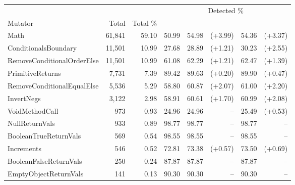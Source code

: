   \begin{tabular*}{\linewidth}{@{\hspace{\tabcolsep}\extracolsep{\fill}}lrrcrrrr}
  \toprule
   &  &  & \multicolumn{5}{c}{Detected \%} \\
  \cmidrule(lr){4-8}
  Mutator & Total & Total \% & \VariantInitial{} & \multicolumn{2}{c}{\VariantNaiveC{}} & \multicolumn{2}{c}{\VariantImprovedC{}} \\
  \midrule
  Math & 61,841 & 59.10 & 50.99 & 54.98 & (+3.99) & 54.36 & (+3.37) \\
  ConditionalsBoundary & 11,501 & 10.99 & 27.68 & 28.89 & (+1.21) & 30.23 & (+2.55) \\
  RemoveConditionalOrderElse & 11,501 & 10.99 & 61.08 & 62.29 & (+1.21) & 62.47 & (+1.39) \\
  PrimitiveReturns & 7,731 & 7.39 & 89.42 & 89.63 & (+0.20) & 89.90 & (+0.47) \\
  RemoveConditionalEqualElse & 5,536 & 5.29 & 58.80 & 60.87 & (+2.07) & 61.00 & (+2.20) \\
  InvertNegs & 3,122 & 2.98 & 58.91 & 60.61 & (+1.70) & 60.99 & (+2.08) \\
  VoidMethodCall & 973 & 0.93 & 24.96 & 24.96 & -- & 25.49 & (+0.53) \\
  NullReturnVals & 933 & 0.89 & 98.77 & 98.77 & -- & 98.77 & -- \\
  BooleanTrueReturnVals & 569 & 0.54 & 98.55 & 98.55 & -- & 98.55 & -- \\
  Increments & 546 & 0.52 & 72.81 & 73.38 & (+0.57) & 73.50 & (+0.69) \\
  BooleanFalseReturnVals & 250 & 0.24 & 87.87 & 87.87 & -- & 87.87 & -- \\
  EmptyObjectReturnVals & 141 & 0.13 & 90.30 & 90.30 & -- & 90.30 & -- \\
  \bottomrule
  \end{tabular*}
